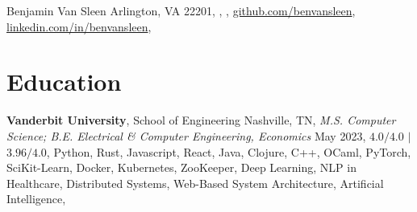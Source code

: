 \documentclass[10.5pt]{article}
\newcommand{\postlinebreakspacing} {
  \vspace{0.7ex}
}
\begin{document}

\resumeheader
{Benjamin Van Sleen}
{
	{Arlington, VA 22201},
	\PHONE,
	\href{mailto:\EMAIL}{\EMAIL},
	\href{https://github.com/benvansleen}{github.com/benvansleen},
	\href{https://linkedin.com/in/benvansleen}{linkedin.com/in/benvansleen},
}

\section*{Education}
\postlinebreakspacing
\lines
{
	{\textbf{Vanderbit University}, School of Engineering \hfill Nashville, TN},
	\hspace*{1em}\textit{M.S. Computer Science; B.E. Electrical \& Computer Engineering, Economics} \hfill May 2023,
	 {$4.0/4.0$} $\mid$  {$3.96/4.0$},
	 {Python, Rust, Javascript, React, Java, Clojure, C++, OCaml, PyTorch, SciKit-Learn, Docker, Kubernetes, ZooKeeper},
	 {Deep Learning, NLP in Healthcare, Distributed Systems, Web-Based System Architecture, Artificial Intelligence},
}
\end{document}
